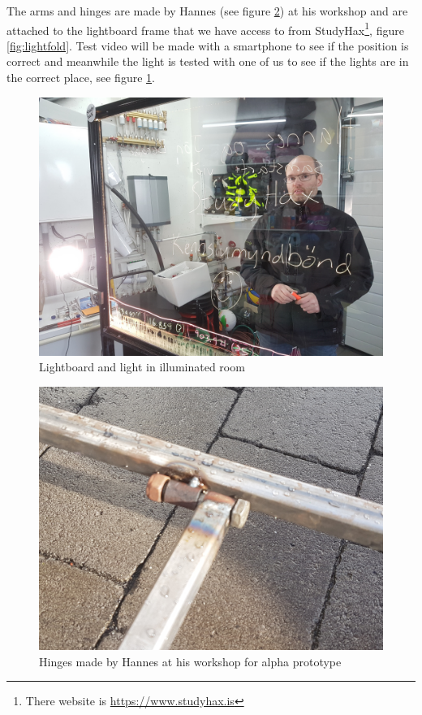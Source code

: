 \documentclass[a4paper]{jpconf}
\begin{document}
The arms and hinges are made by Hannes (see figure \ref{fig:hinge}) at his workshop and are attached to the lightboard frame that we have access to from StudyHax\footnote{There website is \url{https://www.studyhax.is}}, figure \ref{fig:lightfold}.  Test video will be made with a smartphone to see if the position is correct and meanwhile the light is tested with one of us to see if the lights are in the correct place, see figure \ref{fig:LightonHannes}.
\begin{figure}
	\centering
	\includegraphics[width=1\linewidth]{graphicsFromGardabae/LightOnHannes.jpg}
	\caption{Lightboard and light in illuminated room}
	\label{fig:LightonHannes}
\end{figure}
\begin{figure}
	\centering
	\includegraphics[width=1\linewidth]{graphicsFromGardabae/Lom.jpg}
	\caption{Hinges made by Hannes at his workshop for alpha prototype}
	\label{fig:hinge}
\end{figure}
\end{document}

